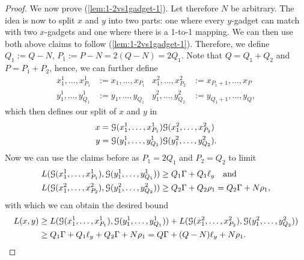 \begin{proof}
We now prove (\ref{lem:1-2vs1gadget-1}).
Let therefore $N$ be arbitrary.
The idea is now to split $x$ and $y$ into two parts: one where every $y$-gadget can match with two $x$-gadgets and one where there is a 1-to-1 mapping.
We can then use both above claims to follow (\ref{lem:1-2vs1gadget-1}).
Therefore, we define $Q_1 := Q-N$, $P_1 := P-N = 2(Q-N) = 2Q_1$.
Note that $Q = Q_1 + Q_2$ and $P = P_1 + P_2$, hence, we can further define
\begin{align*}
x^1_1, \ldots, x^1_{P_1} &:= x_1, \ldots, x_{P_1} %
& %
x^2_1, \ldots, x^2_{P_2} &:= x_{P_1 + 1}, \ldots, x_{P}\\
%
y^1_1, \ldots, y^1_{Q_1} &:= y_1, \ldots, y_{Q_1} %
& %
y^2_1, \ldots, y^2_{Q_2} &:= y_{Q_1 + 1}, \ldots, y_{Q},
\end{align*}
which then defines our split of $x$ and $y$ in
\begin{align*}
x &= \lLCSGadget{x^1_1, \ldots, x^1_{P_1}}\lLCSGadget{x^2_1, \ldots, x^2_{P_2}} \\
%
y &= \lLCSGadget{y^1_1, \ldots, y^1_{Q_1}}\lLCSGadget{y^2_1, \ldots, y^2_{Q_2}}.
\end{align*}
%
Now we can use the claims before as $P_1 = 2Q_1$ and $P_2=Q_2$ to limit 
\begin{align*}
L(\lLCSGadget{x^1_1, \ldots, x^1_{P_1}}, \lLCSGadget{y^1_1, \ldots, y^1_{Q_1}}) &\geq Q_1\Gamma + Q_1\ell_y %
\quad \text{and}\\
%
L(\lLCSGadget{x^2_1, \ldots, x^2_{P_2}}, \lLCSGadget{y^2_1, \ldots, y^2_{Q_2}}) &\geq Q_2\Gamma + Q_2\rho_1 = Q_2\Gamma + N\rho_1, 
\end{align*}
with which we can obtain the desired bound
\begin{align*}
L(x,y) &\geq L(\mathcal{G}(x^1_1, \ldots, x^1_{P_1}), \mathcal{G}(y^1_1, \ldots, y^1_{Q_1})) + L(\mathcal{G}(x^2_1, \ldots, x^2_{P_2}), \mathcal{G}(y^2_1, \ldots, y^2_{Q_2})) \\
	&\geq Q_1\Gamma + Q_1\ell_y + Q_2\Gamma + N\rho_1 = Q\Gamma + (Q-N)\ell_y + N\rho_1.
\end{align*}


\end{proof}

